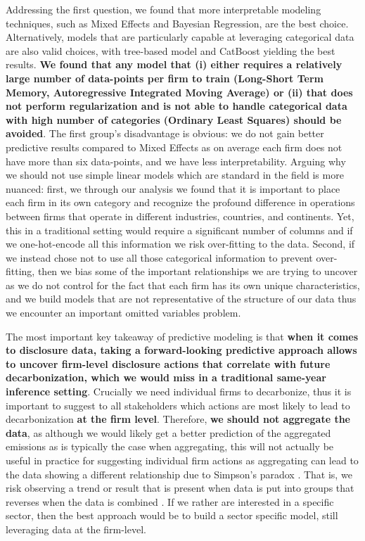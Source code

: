 Addressing the first question, we found that more interpretable modeling techniques, such as Mixed Effects and Bayesian Regression, are the best choice. Alternatively, models that are particularly capable at leveraging categorical data are also valid choices, with tree-based model and CatBoost yielding the best results. \textbf{We found that any model that (i) either requires a relatively large number of data-points per firm to train (Long-Short Term Memory, Autoregressive Integrated Moving Average) or (ii) that does not perform regularization and is not able to handle categorical data with high number of categories (Ordinary Least Squares) should be avoided}. The first group's disadvantage is obvious: we do not gain better predictive results compared to Mixed Effects as on average each firm does not have more than six data-points, and we have less interpretability. Arguing why we should not use simple linear models which are standard in the field is more nuanced: first, we through our analysis we found that it is important to place each firm in its own category and recognize the profound difference in operations between firms that operate in different industries, countries, and continents. Yet, this in a traditional setting would require a significant number of columns and if we one-hot-encode all this information we risk over-fitting to the data. Second, if we instead chose not to use all those categorical information to prevent over-fitting, then we bias some of the important relationships we are trying to uncover as we do not control for the fact that each firm has its own unique characteristics, and we build models that are not representative of the structure of our data thus we encounter an important omitted variables problem. 


The most important key takeaway of predictive modeling is that \textbf{when it comes to disclosure data, taking a forward-looking predictive approach allows to uncover firm-level disclosure actions that correlate with future decarbonization, which we would miss in a traditional same-year inference setting}.  Crucially we need individual firms to decarbonize, thus it is important to suggest to all stakeholders which actions are most likely to lead to decarbonization \textbf{at the firm level}. Therefore,
\textbf{we should not aggregate the data}, as although we would likely get a better prediction of the aggregated emissions as is typically the case when aggregating, this will not actually be useful in practice for suggesting individual firm actions as aggregating can lead to the data showing a different relationship  due to Simpson's paradox \cite{pearl2013understanding}. That is, we risk observing a trend or result that is present when data is put into groups that reverses when the data is combined \cite{simpsons, pearl2013understanding}. If we rather are interested in a specific sector, then the best approach would be to build a sector specific model, still leveraging data at the firm-level.

